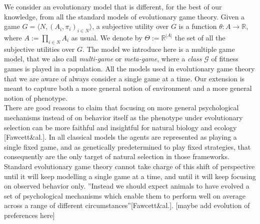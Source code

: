 \documentclass[fleqn,reqno,11pt]{article}
\begin{document}
We consider an evolutionary model that is different, for the best of our knowledge, from all the standard models of evolutionary game theory. Given a game $ G=\langle N, (A_i , \pi_i)_{i \in N} \rangle $, a subjective utility over $G$ is a function $\theta: A \rightarrow \mathbb{R} $, where $ A:=\prod_{i\in N}A_{i} $ as usual. We denote by $ \Theta:= \mathbb{R}^{|A|} $ the set of all the subjective utilities over $G$. The model we introduce here is a multiple game model, that we also call \textit{multi-game} or \textit{meta-game}, where a \textit{class} $\mathcal{G}$ of fitness games is played in a population. All the models used in evolutionary game theory that we are aware of always consider a single game at a time. Our extension is meant to capture both a more general notion of environment and a more general notion of phenotype.\\ 
There are good reasons to claim that focusing on more general psychological mechanisms instead of on behavior itself as the phenotype under evolutionary selection can be more faithful and insightful for natural biology and ecology [Fawcett\&al.].
In all classical models the agents are represented as playing a single fixed game, and as genetically predetermined to play fixed strategies, that consequently are the only target of natural selection in those frameworks. Standard evolutionary game theory cannot take charge of this shift of perspective until it will keep modelling a single game at a time, and until it will keep focusing on observed behavior only. ''Instead we should expect animals to have evolved a set of psychological mechanisms which enable them to perform well on average across a range of different circumstances''[Fawcett\&al.]. [maybe add evolution of preferences here]
\end{document}
